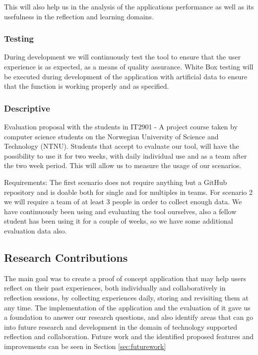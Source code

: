 This will also help us in the analysis of the applications performance as well as its usefulness in the reflection and learning domains.

\subsubsection{Testing}
During development we will continuously test the tool to ensure that the user experience is as expected, as a means of quality assurance.
White Box testing will be executed during development of the application with artificial data to ensure that the function is working properly and as specified. 

\subsubsection{Descriptive}
Evaluation proposal with the students in IT2901 - A project course taken by computer science students on the Norwegian University of Science and Technology (NTNU). 
Students that accept to evaluate our tool, will have the possibility to use it for two weeks, with daily individual use and as a team after the two week period. This will allow us to measure the usage of our scenarios. 

Requirements: 
The first scenario does not require anything but a GitHub repository and is doable both for single and for multiples in teams.
For scenario 2 we will require a team of at least 3 people in order to collect enough data. 
We have continuously been using and evaluating the tool ourselves, also a fellow student has been using it for a couple of weeks, so we have some additional evaluation
data also.

\subsection{Research Contributions}
The main goal was to create a proof of concept application that may help users reflect on their past experiences, both individually and collaboratively in reflection sessions, by collecting experiences daily, storing and revisiting them at any time. The implementation of the application and the evaluation of it gave us a foundation to answer our research questions, and also identify areas that can go into future research and development in the domain of technology supported reflection and collaboration. 
Future work  and the identified proposed features and improvements can be seen in Section \ref{sec:futurework}

